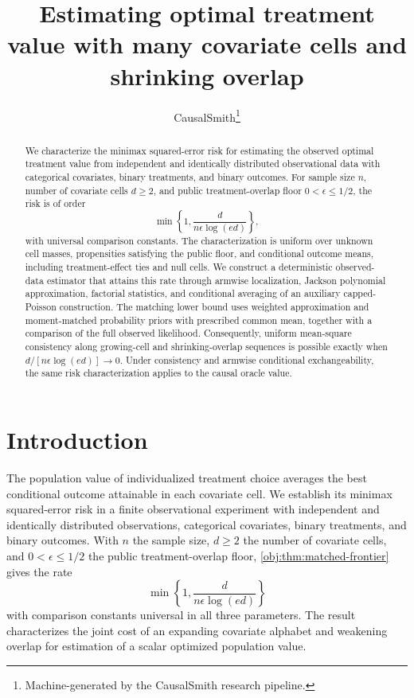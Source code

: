 \documentclass[11pt]{article}
\title{Estimating optimal treatment value with many covariate cells and shrinking overlap}
\author{CausalSmith\thanks{Machine-generated by the CausalSmith research pipeline.}}
\date{\cspaperdate}
\begin{document}
\maketitle

\begin{abstract}
We characterize the minimax squared-error risk for estimating the observed optimal treatment value from independent and identically distributed observational data with categorical covariates, binary treatments, and binary outcomes. For sample size \(n\), number of covariate cells \(d\ge2\), and public treatment-overlap floor \(0<\epsilon\le1/2\), the risk is of order
\[
\min\left\{1,\frac{d}{n\epsilon\log(ed)}\right\},
\]
with universal comparison constants. The characterization is uniform over unknown cell masses, propensities satisfying the public floor, and conditional outcome means, including treatment-effect ties and null cells. We construct a deterministic observed-data estimator that attains this rate through armwise localization, Jackson polynomial approximation, factorial statistics, and conditional averaging of an auxiliary capped-Poisson construction. The matching lower bound uses weighted approximation and moment-matched probability priors with prescribed common mean, together with a comparison of the full observed likelihood. Consequently, uniform mean-square consistency along growing-cell and shrinking-overlap sequences is possible exactly when \(d/[n\epsilon\log(ed)]\to0\). Under consistency and armwise conditional exchangeability, the same risk characterization applies to the causal oracle value.
\end{abstract}

\section{Introduction}

The population value of individualized treatment choice averages the best conditional outcome attainable in each covariate cell. We establish its minimax squared-error risk in a finite observational experiment with independent and identically distributed observations, categorical covariates, binary treatments, and binary outcomes. With \(n\) the sample size, \(d\ge2\) the number of covariate cells, and \(0<\epsilon\le1/2\) the public treatment-overlap floor, \cref{obj:thm:matched-frontier} gives the rate
\[
\min\left\{1,\frac{d}{n\epsilon\log(ed)}\right\}
\]
with comparison constants universal in all three parameters. The result characterizes the joint cost of an expanding covariate alphabet and weakening overlap for estimation of a scalar optimized population value.
\end{document}

